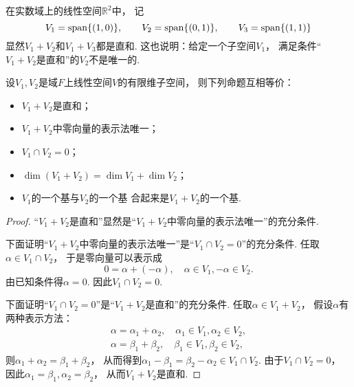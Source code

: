 \begin{example}\label{example:线性空间.子空间.直和.例1}
在实数域上的线性空间\(\mathbb{R}^2\)中，
记\begin{equation*}
	V_1=\operatorname{span}\{(1,0)\},
	\qquad
	V_2=\operatorname{span}\{(0,1)\},
	\qquad
	V_3=\operatorname{span}\{(1,1)\}
\end{equation*}
显然\(V_1+V_2\)和\(V_1+V_3\)都是直和.
这也说明：给定一个子空间\(V_1\)，
满足条件“\(V_1+V_2\)是直和”的\(V_2\)不是唯一的.
\end{example}

\begin{theorem}\label{theorem:线性空间.子空间.直和的等价命题}
设\(V_1,V_2\)是域\(F\)上线性空间\(V\)的有限维子空间，
则下列命题互相等价：\begin{itemize}
	\item \(V_1+V_2\)是直和；
	\item \(V_1+V_2\)中零向量的表示法唯一；
	\item \(V_1 \cap V_2=0\)；
	\item \(\dim(V_1+V_2)=\dim V_1+\dim V_2\)；
	\item \(V_1\)的一个基与\(V_2\)的一个基 合起来是\(V_1+V_2\)的一个基.
\end{itemize}
\begin{proof}
“\(V_1+V_2\)是直和”显然是“\(V_1+V_2\)中零向量的表示法唯一”的充分条件.

下面证明“\(V_1+V_2\)中零向量的表示法唯一”是“\(V_1 \cap V_2=0\)”的充分条件.
任取\(\alpha \in V_1 \cap V_2\)，
于是零向量可以表示成\[
	0 = \alpha + (-\alpha),
	\quad
	\alpha \in V_1,
	-\alpha \in V_2.
\]
由已知条件得\(\alpha = 0\).
因此\(V_1 \cap V_2 = 0\).

下面证明“\(V_1 \cap V_2=0\)”是“\(V_1+V_2\)是直和”的充分条件.
任取\(\alpha \in V_1 + V_2\)，
假设\(\alpha\)有两种表示方法：\begin{gather*}
	\alpha = \alpha_1 + \alpha_2,
	\quad \alpha_1 \in V_1,
	\alpha_2 \in V_2, \\
	\alpha = \beta_1 + \beta_2,
	\quad \beta_1 \in V_1,
	\beta_2 \in V_2,
\end{gather*}
则\(\alpha_1 + \alpha_2
= \beta_1 + \beta_2\)，
从而得到\(\alpha_1 - \beta_1
= \beta_2 - \alpha_2
\in V_1 \cap V_2\).
由于\(V_1 \cap V_2 = 0\)，
因此\(\alpha_1 = \beta_1,
\alpha_2 = \beta_2\)，
从而\(V_1 + V_2\)是直和.


\end{proof}
\end{theorem}
